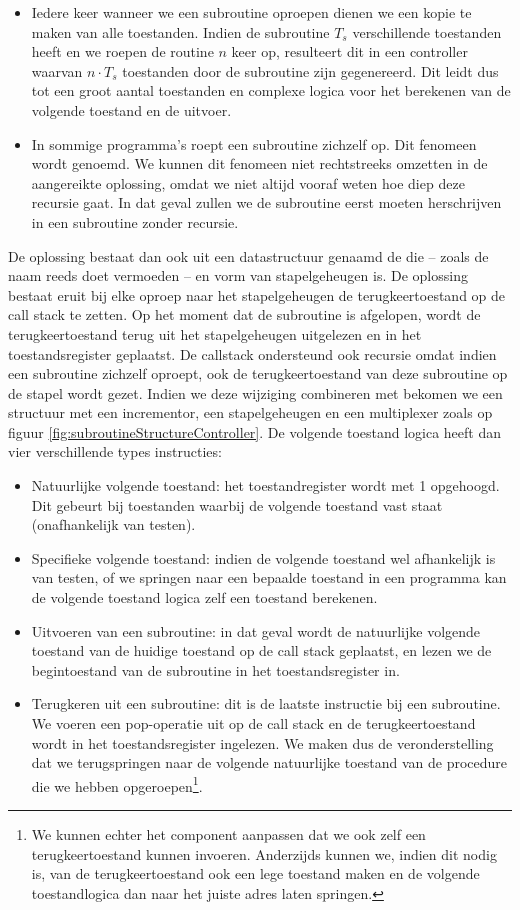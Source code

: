 \begin{itemize}
 \item Iedere keer wanneer we een subroutine oproepen dienen we een kopie te maken van alle toestanden. Indien de subroutine $T_s$ verschillende toestanden heeft en we roepen de routine $n$ keer op, resulteert dit in een controller waarvan $n\cdot T_s$ toestanden door de subroutine zijn gegenereerd. Dit leidt dus tot een groot aantal toestanden en complexe logica voor het berekenen van de volgende toestand en de uitvoer.
 \item In sommige programma's roept een subroutine zichzelf op. Dit fenomeen wordt  genoemd. We kunnen dit fenomeen niet rechtstreeks omzetten in de aangereikte oplossing, omdat we niet altijd vooraf weten hoe diep deze recursie gaat. In dat geval zullen we de subroutine eerst moeten herschrijven in een subroutine zonder recursie.
\end{itemize}
De oplossing bestaat dan ook uit een datastructuur genaamd de  die -- zoals de naam reeds doet vermoeden -- en vorm van stapelgeheugen is. De oplossing bestaat eruit bij elke oproep naar het stapelgeheugen de terugkeertoestand op de call stack te zetten. Op het moment dat de subroutine is afgelopen, wordt de terugkeertoestand terug uit het stapelgeheugen uitgelezen en in het toestandsregister geplaatst. De callstack ondersteund ook recursie omdat indien een subroutine zichzelf oproept, ook de terugkeertoestand van deze subroutine op de stapel wordt gezet. Indien we deze wijziging combineren met bekomen we een structuur met een incrementor, een stapelgeheugen en een multiplexer zoals op figuur \ref{fig:subroutineStructureController}. De volgende toestand logica heeft dan vier verschillende types instructies:
\begin{itemize}
 \item Natuurlijke volgende toestand: het toestandregister wordt met 1 opgehoogd. Dit gebeurt bij toestanden waarbij de volgende toestand vast staat (onafhankelijk van testen).
 \item Specifieke volgende toestand: indien de volgende toestand wel afhankelijk is van testen, of we springen naar een bepaalde toestand in een programma kan de volgende toestand logica zelf een toestand berekenen.
 \item Uitvoeren van een subroutine: in dat geval wordt de natuurlijke volgende toestand van de huidige toestand op de call stack geplaatst, en lezen we de begintoestand van de subroutine in het toestandsregister in.
 \item Terugkeren uit een subroutine: dit is de laatste instructie bij een subroutine. We voeren een pop-operatie uit op de call stack en de terugkeertoestand wordt in het toestandsregister ingelezen. We maken dus de veronderstelling dat we terugspringen naar de volgende natuurlijke toestand van de procedure die we hebben opgeroepen\footnote{We kunnen echter het component aanpassen dat we ook zelf een terugkeertoestand kunnen invoeren. Anderzijds kunnen we, indien dit nodig is, van de terugkeertoestand ook een lege toestand maken en de volgende toestandlogica dan naar het juiste adres laten springen.}.
\end{itemize}
